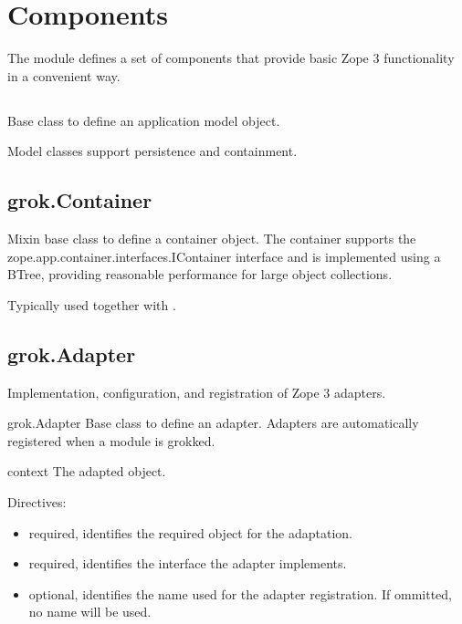 \chapter{Components}

The  module defines a set of components that provide basic Zope 3
functionality in a convenient way.

\section{}

    Base class to define an application model object.

    Model classes support persistence and containment.

\section{grok.Container}

    Mixin base class to define a container object. The container supports the
    zope.app.container.interfaces.IContainer interface and is implemented using
    a BTree, providing reasonable performance for large object collections.

    Typically used together with .

\section{grok.Adapter}

    Implementation, configuration, and registration of Zope 3 adapters.


    \begin{classdesc*}{grok.Adapter}
        Base class to define an adapter. Adapters are automatically registered
        when a module is grokked.

        \begin{memberdesc}{context}
            The adapted object.
        \end{memberdesc}

    \begin{bf}Directives:\end{bf}

    \begin{itemize}
        \item[\function{grok.context(context_obj)}] required, identifies the required object for the
        adaptation.

        \item[\function{grok.implements(interface)}] required, identifies the interface the adapter implements.

        \item[\function{grok.name(name)}] optional, identifies the name used for the adapter
        registration. If ommitted, no name will be used.
    \end{itemize}
    \end{classdesc*}

